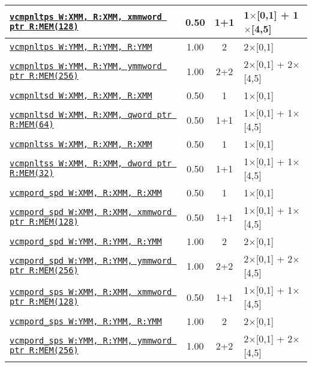\documentclass[a4paper,english,fontsize=9]{scrartcl}
\begin{document}
\begin{longtable}{p{}ccL{.25\textwidth}}
  \midrule
  \texttt{\href{https://felixcloutier.com/x86/CMPPS.html}{vcmpnltps W:XMM, R:XMM, xmmword ptr R:MEM(128)}} & 0.50 & 1+1 & 1\(\times\)[0,1] + 1\(\times\)[4,5] \\
  \midrule
  \texttt{\href{https://felixcloutier.com/x86/CMPPS.html}{vcmpnltps W:YMM, R:YMM, R:YMM}} & 1.00 & 2 & 2\(\times\)[0,1] \\
  \midrule
  \texttt{\href{https://felixcloutier.com/x86/CMPPS.html}{vcmpnltps W:YMM, R:YMM, ymmword ptr R:MEM(256)}} & 1.00 & 2+2 & 2\(\times\)[0,1] + 2\(\times\)[4,5] \\
  \midrule
  \texttt{\href{https://felixcloutier.com/x86/CMPSD.html}{vcmpnltsd W:XMM, R:XMM, R:XMM}} & 0.50 & 1 & 1\(\times\)[0,1] \\
  \midrule
  \texttt{\href{https://felixcloutier.com/x86/CMPSD.html}{vcmpnltsd W:XMM, R:XMM, qword ptr R:MEM(64)}} & 0.50 & 1+1 & 1\(\times\)[0,1] + 1\(\times\)[4,5] \\
  \midrule
  \texttt{\href{https://felixcloutier.com/x86/CMPSS.html}{vcmpnltss W:XMM, R:XMM, R:XMM}} & 0.50 & 1 & 1\(\times\)[0,1] \\
  \midrule
  \texttt{\href{https://felixcloutier.com/x86/CMPSS.html}{vcmpnltss W:XMM, R:XMM, dword ptr R:MEM(32)}} & 0.50 & 1+1 & 1\(\times\)[0,1] + 1\(\times\)[4,5] \\
  \midrule
  \texttt{\href{https://felixcloutier.com/x86/CMPPD.html}{vcmpord\_spd W:XMM, R:XMM, R:XMM}} & 0.50 & 1 & 1\(\times\)[0,1] \\
  \midrule
  \texttt{\href{https://felixcloutier.com/x86/CMPPD.html}{vcmpord\_spd W:XMM, R:XMM, xmmword ptr R:MEM(128)}} & 0.50 & 1+1 & 1\(\times\)[0,1] + 1\(\times\)[4,5] \\
  \midrule
  \texttt{\href{https://felixcloutier.com/x86/CMPPD.html}{vcmpord\_spd W:YMM, R:YMM, R:YMM}} & 1.00 & 2 & 2\(\times\)[0,1] \\
  \midrule
  \texttt{\href{https://felixcloutier.com/x86/CMPPD.html}{vcmpord\_spd W:YMM, R:YMM, ymmword ptr R:MEM(256)}} & 1.00 & 2+2 & 2\(\times\)[0,1] + 2\(\times\)[4,5] \\
  \midrule
  \texttt{\href{https://felixcloutier.com/x86/CMPPS.html}{vcmpord\_sps W:XMM, R:XMM, xmmword ptr R:MEM(128)}} & 0.50 & 1+1 & 1\(\times\)[0,1] + 1\(\times\)[4,5] \\
  \midrule
  \texttt{\href{https://felixcloutier.com/x86/CMPPS.html}{vcmpord\_sps W:YMM, R:YMM, R:YMM}} & 1.00 & 2 & 2\(\times\)[0,1] \\
  \midrule
  \texttt{\href{https://felixcloutier.com/x86/CMPPS.html}{vcmpord\_sps W:YMM, R:YMM, ymmword ptr R:MEM(256)}} & 1.00 & 2+2 & 2\(\times\)[0,1] + 2\(\times\)[4,5] \\

\end{longtable}
\end{document}
